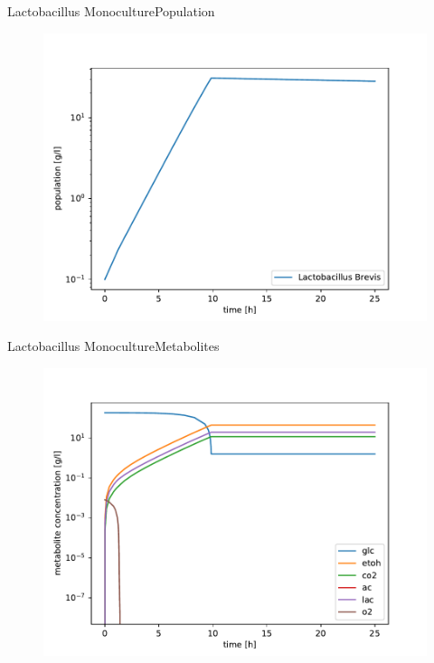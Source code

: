 \documentclass{beamer}
\begin{document}
\begin{frame}{Lactobacillus Monoculture}{Population}
	\begin{figure}
		\includegraphics[width=0.9\linewidth]{Img/Results/lactobacillus/lactobacillus_populations.pdf}
	\end{figure}
\end{frame}

\begin{frame}{Lactobacillus Monoculture}{Metabolites}
	\begin{figure}
		\includegraphics[width=0.9\linewidth]{Img/Results/lactobacillus/lactobacillus_metabolites.pdf}
	\end{figure}
\end{frame}
\end{document}
